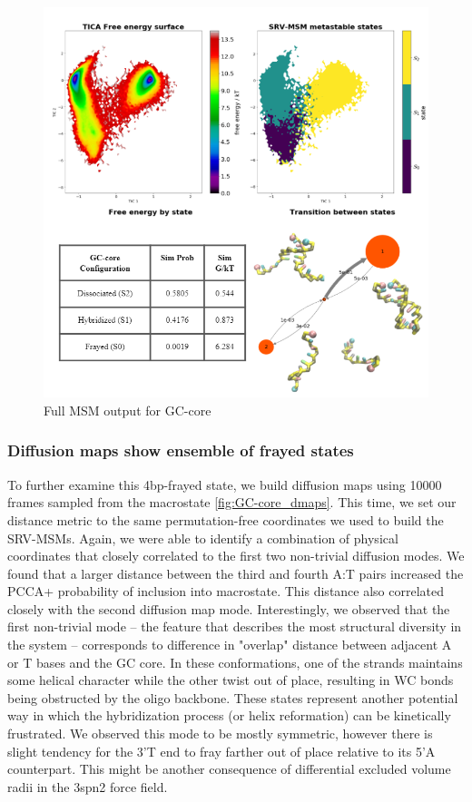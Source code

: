 \documentclass[journal=jpcbfk,manuscript=article]{achemso}
\begin{document}
\begin{figure}[ht!]
	\begin{center}
        \includegraphics[width=\textwidth]{Figs/figs_0804/GC-core_thermo.PNG}
        \caption{Full MSM output for GC-core}
        \label{fig:GC-core_thermo}
	\end{center}
\end{figure}

\subsubsection{\label{sec:Results}Diffusion maps show ensemble of frayed states}

To further examine this 4bp-frayed state, we build diffusion maps using 10000 frames sampled from the macrostate \ref{fig:GC-core_dmaps}. This time, we set our distance metric to the same permutation-free coordinates we used to build the SRV-MSMs. Again, we were able to identify a combination of physical coordinates that closely correlated to the first two non-trivial diffusion modes. We found that a larger distance between the third and fourth A:T pairs increased the PCCA+ probability of inclusion into macrostate. This distance also correlated closely with the second diffusion map mode. Interestingly, we observed that the first non-trivial mode -- the feature that describes the most structural diversity in the system -- corresponds to difference in "overlap" distance between adjacent A or T bases and the GC core. In these conformations, one of the strands maintains some helical character while the other twist out of place, resulting in WC bonds being obstructed by the oligo backbone. These states represent another potential way in which the hybridization process (or helix reformation) can be kinetically frustrated. We observed this mode to be mostly symmetric, however there is slight tendency for the 3'T end to fray farther out of place relative to its 5'A counterpart. This might be another consequence of differential excluded volume radii in the 3spn2 force field.
\end{document}
